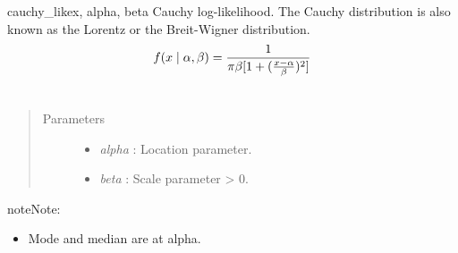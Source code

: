 \hypertarget{pymc.distributions.cauchy_like}{}\begin{funcdesc}{cauchy\_like}{x, alpha, beta}
Cauchy log-likelihood. The Cauchy distribution is also known as the
Lorentz or the Breit-Wigner distribution.
\begin{gather}
\begin{split}f(x \mid \alpha, \beta) = \frac{1}{\pi \beta [1 + (\frac{x-\alpha}{\beta})^2]}\end{split}\notag\\\begin{split}\end{split}\notag
\end{gather}\begin{quote}\begin{description}
\item[Parameters] \leavevmode\begin{itemize}
\item {} 
\emph{alpha} : Location parameter.

\item {} 
\emph{beta} : Scale parameter \textgreater{} 0.

\end{itemize}

\end{description}\end{quote}

\begin{notice}{note}{Note:}\begin{itemize}
\item {} 
Mode and median are at alpha.

\end{itemize}
\end{notice}
\end{funcdesc}

